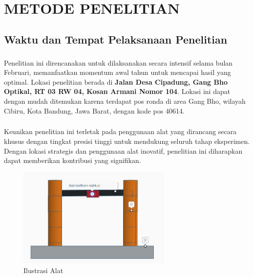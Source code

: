 \chapter{METODE PENELITIAN}\label{cha:metode}


\section{Waktu dan Tempat Pelaksanaan Penelitian}
\paragraph{}Penelitian ini direncanakan untuk dilaksanakan secara intensif selama bulan Februari, memanfaatkan momentum awal tahun untuk mencapai hasil yang optimal. Lokasi penelitian berada di \textbf{Jalan Desa Cipadung, Gang Bho Optikal, RT 03 RW 04, Kosan Armani Nomor 104}. Lokasi ini dapat dengan mudah ditemukan karena terdapat pos ronda di area Gang Bho, wilayah Cibiru, Kota Bandung, Jawa Barat, dengan kode pos 40614.

\paragraph{}Keunikan penelitian ini terletak pada penggunaan alat yang dirancang secara khusus dengan tingkat presisi tinggi untuk mendukung seluruh tahap eksperimen. Dengan lokasi strategis dan penggunaan alat inovatif, penelitian ini diharapkan dapat memberikan kontribusi yang signifikan.

\begin{figure}
    \centering
    \includegraphics[width = 18pc]{images/Ilustrasi Alat.png}
    \caption{Ilustrasi Alat}
    \label{fig:ilustrasi_alat}
\end{figure}
